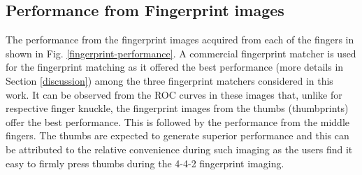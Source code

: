 \subsection{Performance from Fingerprint images\label{fp-performance}}

The performance from the fingerprint images acquired from each of the fingers in shown in Fig. \ref{fingerprint-performance}. A commercial fingerprint matcher is used for the fingerprint matching as it offered the best performance (more details in Section \ref{discussion}) among the three fingerprint matchers considered in this work. It can be observed from the ROC curves in these images that, unlike for respective finger knuckle, the fingerprint images from the thumbs (thumbprints) offer the best performance. This is followed by the performance from the middle fingers. The thumbs are expected to generate superior performance and this can be attributed to the relative convenience during such imaging as the users find it easy to firmly press thumbs during the 4-4-2 fingerprint imaging. 

